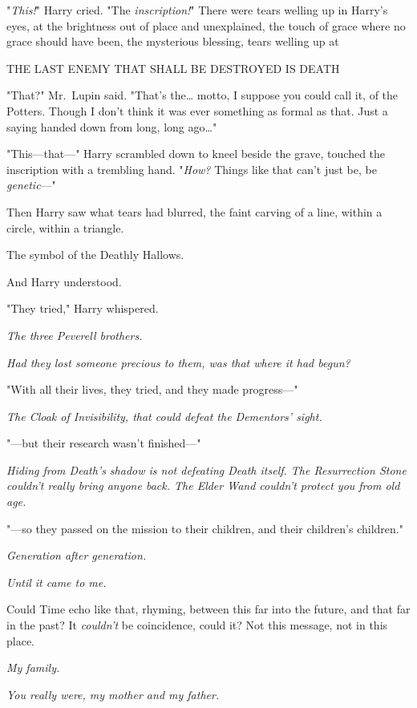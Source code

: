"\emph{This!}" Harry cried. "The \emph{inscription!}" There were tears welling 
up in Harry's eyes, at the brightness out of place and unexplained, the touch 
of grace where no grace should have been, the mysterious blessing, tears 
welling up at

\begin{center}
THE LAST ENEMY THAT SHALL BE DESTROYED IS DEATH
\end{center}

"That?" Mr.~Lupin said. "That's the{\ldots} motto, I suppose you could call it, 
of the Potters. Though I don't think it was ever something as formal as that. 
Just a saying handed down from long, long ago{\ldots}"

"This---that---" Harry scrambled down to kneel beside the grave, touched the 
inscription with a trembling hand. "\emph{How?} Things like that can't just be, 
be \emph{genetic}---"

Then Harry saw what tears had blurred, the faint carving of a line, within a 
circle, within a triangle.

The symbol of the Deathly Hallows.

And Harry understood.

"They tried," Harry whispered.

\emph{The three Peverell brothers.}

\emph{Had they lost someone precious to them, was that where it had begun?}

"With all their lives, they tried, and they made progress---"

\emph{The Cloak of Invisibility, that could defeat the Dementors' sight.}

"---but their research wasn't finished---"

\emph{Hiding from Death's shadow is not defeating Death itself. The 
Resurrection Stone couldn't really bring anyone back. The Elder Wand couldn't 
protect you from old age.}

"---so they passed on the mission to their children, and their children's 
children."

\emph{Generation after generation.}

\emph{Until it came to me.}

Could Time echo like that, rhyming, between this far into the future, and that 
far in the past? It \emph{couldn't} be coincidence, could it? Not this message, 
not in this place.

\emph{My family.}

\emph{You really were, my mother and my father.}

